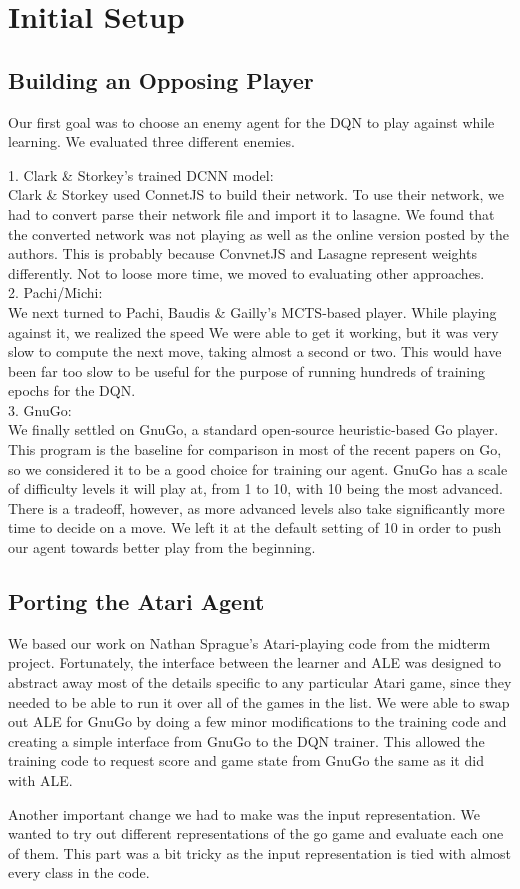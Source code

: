 \section{Initial Setup}

\subsection*{Building an Opposing Player}

Our first goal was to choose an enemy agent for the DQN to play against while learning. We evaluated three different enemies.

1. Clark \& Storkey's trained DCNN model: \\

Clark \& Storkey used ConnetJS to build their network. To use their network, we had to convert parse their network file and import it to lasagne. We found that the converted network was not playing as well as the online version posted by the authors. This is probably because ConvnetJS and Lasagne represent weights differently. Not to loose more time, we moved to evaluating other approaches.
\\
2. Pachi/Michi: 
\\
We next turned to Pachi, Baudis \& Gailly's MCTS-based player. While playing against it, we realized the speed  We were able to get it working, but it was very slow to compute the next move, taking almost a second or two. This would have been far too slow to be useful for the purpose of running hundreds of training epochs for the DQN.
\\
3. GnuGo:
\\
We finally settled on GnuGo, a standard open-source heuristic-based Go player. This program is the baseline for comparison in most of the recent papers on Go, so we considered it to be a good choice for training our agent. GnuGo has a scale of difficulty levels it will play at, from 1 to 10, with 10 being the most advanced. There is a tradeoff, however, as more advanced levels also take significantly more time to decide on a move. We left it at the default setting of 10 in order to push our agent towards better play from the beginning.

\subsection*{Porting the Atari Agent}

We based our work on Nathan Sprague's Atari-playing code from the midterm project. Fortunately, the interface between the learner and ALE was designed to abstract away most of the details specific to any particular Atari game, since they needed to be able to run it over all of the games in the list. We were able to swap out ALE for GnuGo by doing a few minor modifications to the training code and creating a simple interface from GnuGo to the DQN trainer. This allowed the training code to request score and game state from GnuGo the same as it did with ALE.

Another important change we had to make was the input representation. We wanted to try out different representations of the go game and evaluate each one of them. This part was a bit tricky as the input representation is tied with almost every class in the code.